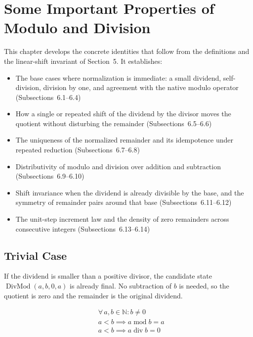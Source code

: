 \section{Some Important Properties of Modulo and Division}
\label{sec:properties}

This chapter develops the concrete identities that follow from the
definitions and the linear-shift invariant of Section~5. It establishes:

\begin{itemize}
  \item The base cases where normalization is immediate: a small dividend,
    self-division, division by one, and agreement with the native modulo
    operator (Subsections~6.1--6.4)
  \item How a single or repeated shift of the dividend by the divisor moves
    the quotient without disturbing the remainder (Subsections~6.5--6.6)
  \item The uniqueness of the normalized remainder and its idempotence under
    repeated reduction (Subsections~6.7--6.8)
  \item Distributivity of modulo and division over addition and subtraction
    (Subsections~6.9--6.10)
  \item Shift invariance when the dividend is already divisible by the base,
    and the symmetry of remainder pairs around that base
    (Subsections~6.11--6.12)
  \item The unit-step increment law and the density of zero remainders across
    consecutive integers (Subsections~6.13--6.14)
\end{itemize}

\subsection{Trivial Case}
\label{sec:trivial-case}

If the dividend is smaller than a positive divisor, the candidate state
$\operatorname{DivMod}(a,b,0,a)$ is already final. No subtraction of $b$ is
needed, so the quotient is zero and the remainder is the original dividend.

\begin{equation*}
\begin{aligned}
& \forall\, a, b \in \mathbb{N} : b \neq 0 \\
& a < b \implies a \operatorname{mod} b = a \\
& a < b \implies a \operatorname{div} b = 0
\end{aligned}
\end{equation*}

